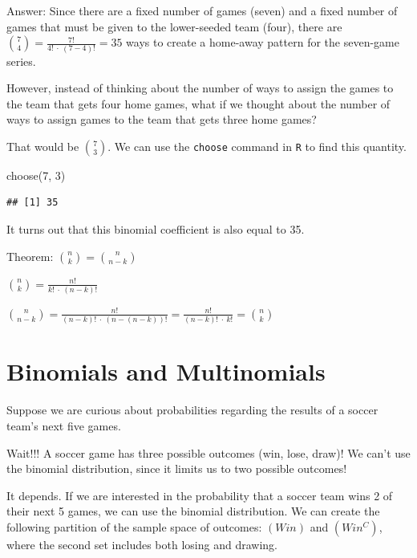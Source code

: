\documentclass[
  11pt,
]{book}
\newenvironment{Shaded}{\begin{snugshade}}{\end{snugshade}}
\newcommand{\DecValTok}[1]{\textcolor[rgb]{0.00,0.00,0.81}{#1}}
\newcommand{\FunctionTok}[1]{\textcolor[rgb]{0.00,0.00,0.00}{#1}}
\newcommand{\NormalTok}[1]{#1}
\theoremstyle{definition}
\theoremstyle{definition}
\theoremstyle{definition}
\theoremstyle{definition}
\theoremstyle{remark}
\begin{document}
Answer: Since there are a fixed number of games (seven) and a fixed number of games that must be given to the lower-seeded team (four), there are \(\binom{7}{4} = \frac{7!}{4!\ \cdot\ (7-4)!} = 35\) ways to create a home-away pattern for the seven-game series.

However, instead of thinking about the number of ways to assign the games to the team that gets four home games, what if we thought about the number of ways to assign games to the team that gets three home games?

That would be \(\binom{7}{3}\). We can use the \texttt{choose} command in \texttt{R} to find this quantity.

\begin{Shaded}
\begin{Highlighting}[]
\FunctionTok{choose}\NormalTok{(}\DecValTok{7}\NormalTok{, }\DecValTok{3}\NormalTok{)}
\end{Highlighting}
\end{Shaded}

\begin{verbatim}
## [1] 35
\end{verbatim}

It turns out that this binomial coefficient is also equal to 35.

Theorem: \(\binom{n}{k} = \binom{n}{n-k}\)

\(\binom{n}{k} = \frac{n!}{k!\ \cdot\ (n-k)!}\)

\(\binom{n}{n-k} = \frac{n!}{(n-k)!\ \cdot\ (n-(n-k))!} = \frac{n!}{(n-k)!\ \cdot\ k!} = \binom{n}{k}\)

\hypertarget{binomials-and-multinomials-1}{%
\section{Binomials and Multinomials}\label{binomials-and-multinomials-1}}

Suppose we are curious about probabilities regarding the results of a soccer team's next five games.

Wait!!! A soccer game has three possible outcomes (win, lose, draw)! We can't use the binomial distribution, since it limits us to two possible outcomes!

It depends. If we are interested in the probability that a soccer team wins 2 of their next 5 games, we can use the binomial distribution. We can create the following partition of the sample space of outcomes: \((Win)\) and \((Win^C)\), where the second set includes both losing and drawing.
\end{document}
